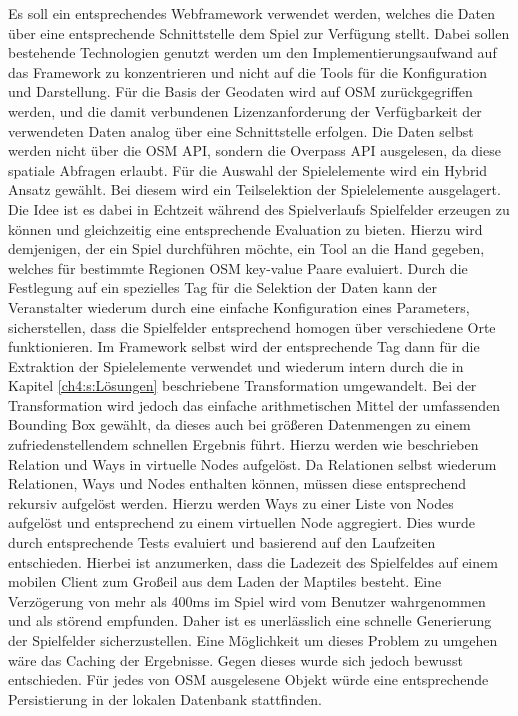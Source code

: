 Es soll ein entsprechendes Webframework verwendet werden, welches die Daten über eine entsprechende Schnittstelle dem Spiel zur Verfügung stellt. Dabei sollen bestehende Technologien genutzt werden um den Implementierungsaufwand auf das Framework zu konzentrieren und nicht auf die Tools für die Konfiguration und Darstellung.
Für die Basis der Geodaten wird auf OSM zurückgegriffen werden, und die damit verbundenen Lizenzanforderung der Verfügbarkeit der verwendeten Daten analog über eine Schnittstelle erfolgen. Die Daten selbst werden nicht über die OSM API, sondern die Overpass API ausgelesen, da diese spatiale Abfragen erlaubt.
Für die Auswahl der Spielelemente wird ein Hybrid Ansatz gewählt. Bei diesem wird ein Teilselektion der Spielelemente ausgelagert.
Die Idee ist es dabei in Echtzeit während des Spielverlaufs Spielfelder erzeugen zu können und gleichzeitig eine entsprechende Evaluation zu bieten. Hierzu wird demjenigen, der ein Spiel durchführen möchte, ein Tool an die Hand gegeben, welches für bestimmte Regionen OSM key-value Paare evaluiert. Durch die Festlegung auf ein spezielles Tag für die Selektion der Daten kann der Veranstalter wiederum durch eine einfache Konfiguration eines Parameters, sicherstellen, dass die Spielfelder entsprechend homogen über verschiedene Orte funktionieren. Im Framework selbst wird der entsprechende Tag dann für die Extraktion der Spielelemente verwendet und wiederum intern durch die in Kapitel \ref{ch4:s:Lösungen} beschriebene Transformation umgewandelt. Bei der Transformation wird jedoch das einfache arithmetischen Mittel der umfassenden Bounding Box gewählt, da dieses auch bei größeren Datenmengen zu einem zufriedenstellendem schnellen Ergebnis führt. Hierzu werden wie beschrieben Relation und Ways in virtuelle Nodes aufgelöst. Da Relationen selbst wiederum Relationen, Ways und Nodes enthalten können, müssen diese entsprechend rekursiv aufgelöst werden. Hierzu werden Ways zu einer Liste von Nodes aufgelöst und entsprechend zu einem virtuellen Node aggregiert. Dies wurde durch entsprechende Tests evaluiert und basierend auf den Laufzeiten entschieden. Hierbei ist anzumerken, dass die Ladezeit des Spielfeldes auf einem mobilen Client zum Großeil aus dem Laden der Maptiles besteht. Eine Verzögerung von mehr als 400ms im Spiel wird vom Benutzer wahrgenommen und als störend empfunden.\cite{Gutwin.2004} Daher ist es unerlässlich eine schnelle Generierung der Spielfelder sicherzustellen. 
Eine Möglichkeit um dieses Problem zu umgehen wäre das Caching der Ergebnisse. Gegen dieses wurde sich jedoch bewusst entschieden. Für jedes von OSM ausgelesene Objekt würde eine entsprechende Persistierung in der lokalen Datenbank stattfinden.
